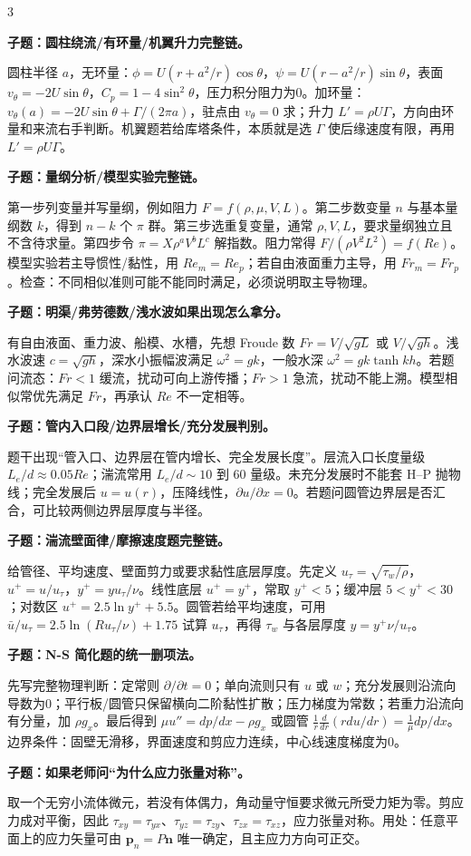 \documentclass[a4paper]{article}
\newcommand{\qt}[1]{\vspace{0.10pt}\colorbox{Q}{\parbox{\dimexpr\linewidth-2\fboxsep}{\color{white}\bfseries #1}}\par}
\newcommand{\ans}[1]{\colorbox{G}{\parbox{\dimexpr\linewidth-2\fboxsep}{#1}}\par}
\begin{document}
\begin{multicols}{3}
\qt{子题：圆柱绕流/有环量/机翼升力完整链。}
\ans{圆柱半径 $a$，无环量：$\phi=U(r+a^2/r)\cos\theta$，$\psi=U(r-a^2/r)\sin\theta$，表面 $v_\theta=-2U\sin\theta$，$C_p=1-4\sin^2\theta$，压力积分阻力为0。加环量：$v_\theta(a)=-2U\sin\theta+\Gamma/(2\pi a)$，驻点由 $v_\theta=0$ 求；升力 $L'=\rho U\Gamma$，方向由环量和来流右手判断。机翼题若给库塔条件，本质就是选 $\Gamma$ 使后缘速度有限，再用 $L'=\rho U\Gamma$。}
\qt{子题：量纲分析/模型实验完整链。}
\ans{第一步列变量并写量纲，例如阻力 $F=f(\rho,\mu,V,L)$。第二步数变量 $n$ 与基本量纲数 $k$，得到 $n-k$ 个 $\pi$ 群。第三步选重复变量，通常 $\rho,V,L$，要求量纲独立且不含待求量。第四步令 $\pi=X\rho^aV^bL^c$ 解指数。阻力常得 $F/(\rho V^2L^2)=f(Re)$。模型实验若主导惯性/黏性，用 $Re_m=Re_p$；若自由液面重力主导，用 $Fr_m=Fr_p$。检查：不同相似准则可能不能同时满足，必须说明取主导物理。}
\qt{子题：明渠/弗劳德数/浅水波如果出现怎么拿分。}
\ans{有自由液面、重力波、船模、水槽，先想 Froude 数 $Fr=V/\sqrt{gL}$ 或 $V/\sqrt{gh}$。浅水波速 $c=\sqrt{gh}$，深水小振幅波满足 $\omega^2=gk$，一般水深 $\omega^2=gk\tanh kh$。若题问流态：$Fr<1$ 缓流，扰动可向上游传播；$Fr>1$ 急流，扰动不能上溯。模型相似常优先满足 $Fr$，再承认 $Re$ 不一定相等。}
\qt{子题：管内入口段/边界层增长/充分发展判别。}
\ans{题干出现“管入口、边界层在管内增长、完全发展长度”。层流入口长度量级 $L_e/d\approx0.05Re$；湍流常用 $L_e/d\sim10$ 到 $60$ 量级。未充分发展时不能套 H--P 抛物线；完全发展后 $u=u(r)$，压降线性，$\partial u/\partial x=0$。若题问圆管边界层是否汇合，可比较两侧边界层厚度与半径。}
\qt{子题：湍流壁面律/摩擦速度题完整链。}
\ans{给管径、平均速度、壁面剪力或要求黏性底层厚度。先定义 $u_\tau=\sqrt{\tau_w/\rho}$，$u^+=u/u_\tau$，$y^+=yu_\tau/\nu$。线性底层 $u^+=y^+$，常取 $y^+<5$；缓冲层 $5<y^+<30$；对数区 $u^+=2.5\ln y^+ +5.5$。圆管若给平均速度，可用 $\bar u/u_\tau=2.5\ln(Ru_\tau/\nu)+1.75$ 试算 $u_\tau$，再得 $\tau_w$ 与各层厚度 $y= y^+\nu/u_\tau$。}
\qt{子题：N-S 简化题的统一删项法。}
\ans{先写完整物理判断：定常则 $\partial/\partial t=0$；单向流则只有 $u$ 或 $w$；充分发展则沿流向导数为0；平行板/圆管只保留横向二阶黏性扩散；压力梯度为常数；若重力沿流向有分量，加 $\rho g_x$。最后得到 $\mu u''=dp/dx-\rho g_x$ 或圆管 $\frac1r\frac d{dr}(rdu/dr)=\frac1\mu dp/dx$。边界条件：固壁无滑移，界面速度和剪应力连续，中心线速度梯度为0。}
\qt{子题：如果老师问“为什么应力张量对称”。}
\ans{取一个无穷小流体微元，若没有体偶力，角动量守恒要求微元所受力矩为零。剪应力成对平衡，因此 $\tau_{xy}=\tau_{yx}$、$\tau_{yz}=\tau_{zy}$、$\tau_{zx}=\tau_{xz}$，应力张量对称。用处：任意平面上的应力矢量可由 $\bm p_n=P\bm n$ 唯一确定，且主应力方向可正交。}


\end{multicols}
\end{document}
